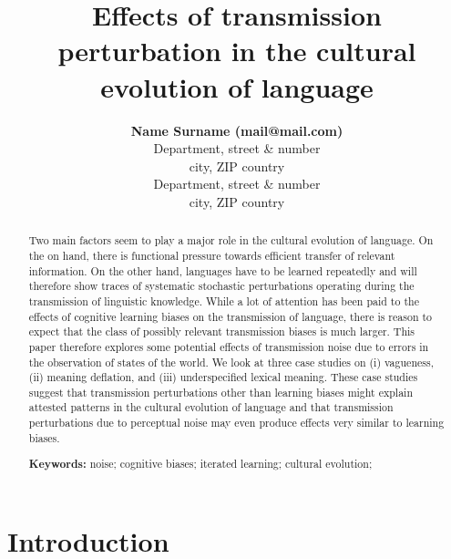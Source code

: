 \documentclass[10pt,a4paper]{article}
\title{Effects of transmission perturbation in the cultural evolution of language}
\author{{\large \bf Name Surname (mail@mail.com)} \\
  Department, street \& number \\
  city, ZIP country
  \AND {\large \bf Name Surname (mail@mail.com)} \\
  Department, street \& number \\
  city, ZIP country}
\begin{document}
\maketitle

\begin{abstract}
  Two main factors seem to play a major role in the cultural evolution of language. On the on
  hand, there is functional pressure towards efficient transfer of relevant information. On the
  other hand, languages have to be learned repeatedly and will therefore show traces of
  systematic stochastic perturbations operating during the transmission of linguistic
  knowledge. While a lot of attention has been paid to the effects of cognitive learning biases
  on the transmission of language, there is reason to expect that the class of possibly
  relevant transmission biases is much larger. This paper therefore explores some potential
  effects of transmission noise due to errors in the observation of states of the world. We
  look at three case studies on (i) vagueness, (ii) meaning deflation, and (iii) underspecified
  lexical meaning. These case studies suggest that transmission perturbations other than
  learning biases might explain attested patterns in the cultural evolution of language and
  that transmission perturbations due to perceptual noise may even produce effects very similar
  to learning biases.

\textbf{Keywords:} 
noise; cognitive biases; iterated learning; cultural evolution;  
\end{abstract}


\section{Introduction}
\end{document}
